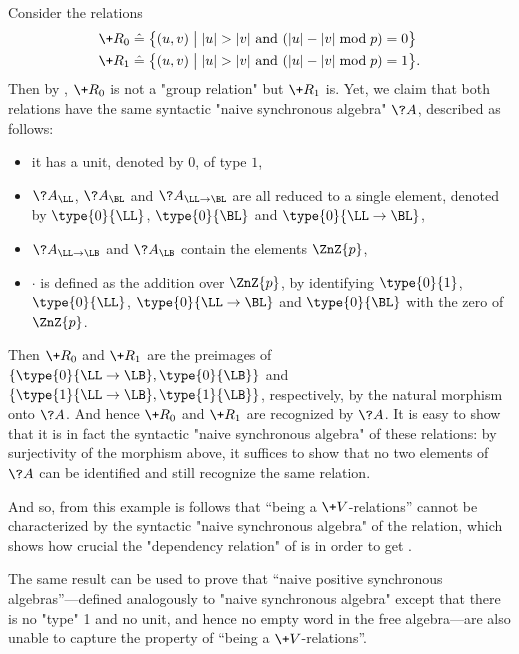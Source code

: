 \begin{example}
	Consider the relations
	\begin{align*}
		\+R_0 \defeq \big\{
			(u,v) \;\big\vert\; & |u| > |v| \text{ and } (|u| - |v| \bmod{p}) = 0
		\big\} \\
		\+R_1 \defeq \big\{
			(u,v) \;\big\vert\; & |u| > |v| \text{ and } (|u| - |v| \bmod{p}) = 1
		\big\}.
	\end{align*}
	Then by , $\+R_0$ is not a "group relation" but
	$\+R_1$ is.
	Yet, we claim that both relations have the same syntactic "naive synchronous algebra" $\?A$, described as follows:
	\begin{itemize}
		\item it has a unit, denoted by $0$, of type $1$,
		\item $\?A_{\LL}$, $\?A_{\BL}$ and $\?A_{\LL\to\BL}$ are all reduced to a single element,
			denoted by $\type{0}{\LL}$, $\type{0}{\BL}$ and $\type{0}{\LL\to\BL}$,
		\item $\?A_{\LL\to\LB}$ and $\?A_{\LB}$ contain the elements $\ZnZ{p}$,
		\item $\cdot$ is defined as the addition over $\ZnZ{p}$, by identifying
			$\type{0}{1}$, $\type{0}{\LL}$, $\type{0}{\LL\to\BL}$ and $\type{0}{\BL}$
			with the zero of $\ZnZ{p}$.
	\end{itemize}
	Then $\+R_0$ and $\+R_1$ are the preimages of $\{\type{0}{\LL\to\LB}, \type{0}{\LB}\}$
	and $\{\type{1}{\LL\to\LB}, \type{1}{\LB}\}$, respectively, by the natural morphism onto $\?A$.
	And hence $\+R_0$ and $\+R_1$ are recognized by $\?A$. It is easy to show that it is in fact the syntactic "naive synchronous algebra" of these relations: by surjectivity of the morphism 
	above, it suffices to show that no two elements of $\?A$ can be identified and still recognize 
	the same relation.
\end{example}

And so, from this example is follows that ``being a $\+V$-relations'' cannot be characterized
by the syntactic "naive synchronous algebra" of the relation, which shows how crucial the "dependency relation" of  is in order to get .

The same result can be used to prove that ``naive positive synchronous algebras''---defined analogously to "naive synchronous algebra" except that there is no "type" 1 and no unit, and hence no empty word in the free algebra---are also unable to capture the property of ``being a $\+V$-relations''.

